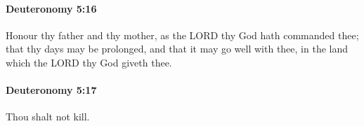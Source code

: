 		\paragraph{Deuteronomy 5:16} %
			\label{DEUTERONOMY-5-16}

			Honour thy father and thy mother, as the LORD thy God hath commanded thee; that thy days may be prolonged, and that it may go well with thee, in the land which the LORD thy God giveth thee.


		\paragraph{Deuteronomy 5:17} %
			\label{DEUTERONOMY-5-17}

			Thou shalt not kill.


